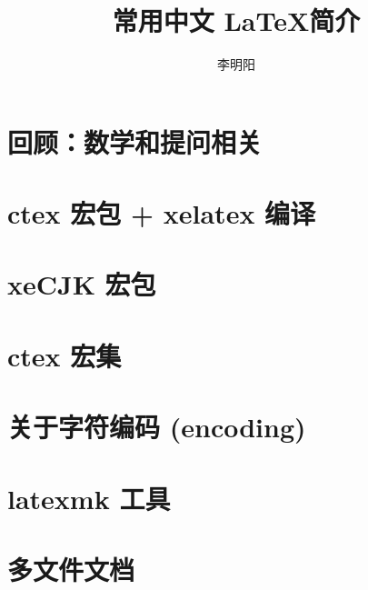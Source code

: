 \documentclass{ctexart}
\title{常用中文 \LaTeX 简介}
\author{李明阳}
\begin{document}
\maketitle

\setcounter{section}{-1}

\section{回顾：数学和提问相关}


\tableofcontents

\section{ctex 宏包 + xelatex 编译}


\section{xeCJK 宏包}


\section{ctex 宏集}



\appendix
\section{关于字符编码 (encoding)}


\section{latexmk 工具}\label{ap:latexmk}


\section{多文件文档}


\listoftables
\lstlistoflistings
{}\label{lstof:exercises}

\printbibliography
\end{document}
